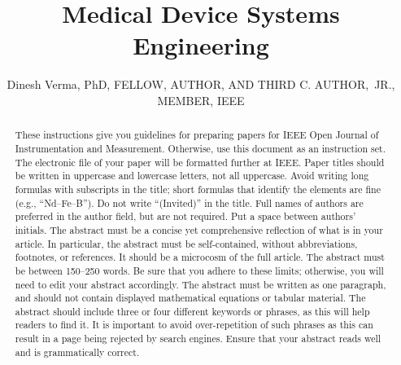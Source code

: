 \documentclass{IEEEoj}
\begin{document}

\title{Medical Device Systems Engineering}

\author{Dinesh Verma, PhD, FELLOW,
AUTHOR, AND THIRD C. AUTHOR,~JR.,
MEMBER, IEEE}





\begin{abstract}
These instructions give you guidelines for preparing papers for IEEE
Open Journal of Instrumentation and Measurement.
 Otherwise, use this document as an instruction set. The electronic file of your paper will be formatted further at IEEE. Paper titles should be written in uppercase and lowercase letters, not all uppercase. Avoid writing long formulas with subscripts in the title; short formulas that identify the elements are fine (e.g., ``Nd--Fe--B''). Do not write ``(Invited)'' in the title. Full names of authors are preferred in the author field, but are not required. Put a space between authors' initials. The abstract must be a concise yet comprehensive reflection of what is in your article. In particular, the abstract must be self-contained, without abbreviations, footnotes, or references. It should be a microcosm of the full article. The abstract must be between 150--250 words. Be sure that you adhere to these limits; otherwise, you will need to edit your abstract accordingly. The abstract must be written as one paragraph, and should not contain displayed mathematical equations or tabular material. The abstract should include three or four different keywords or phrases, as this will help readers to find it. It is important to avoid over-repetition of such phrases as this can result in a page being rejected by search engines. Ensure that your abstract reads well and is grammatically correct.
\end{abstract}
\end{document}
